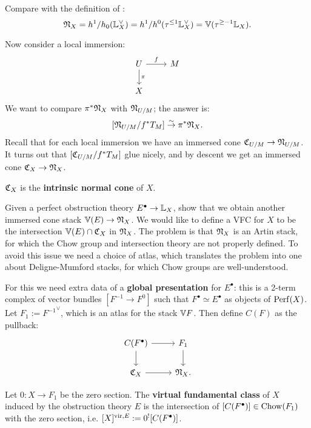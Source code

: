 Compare with the definition of \cite{Behrend_Intrinsic_normal_cone_1997}:
\[	\mathfrak N_X = h^1/h_0(\mathbb L_X^{\vee}) = h^1/h^0(\tau^{\leq 1}\mathbb L_X^{\vee}) = \mathbb V(\tau^{\geq -1} \mathbb L_X) .	\]

Now consider a local immersion:
\[
\begin{tikzcd}
U\arrow{r}{f}\arrow{d}{\pi} & M \\ X & 
\end{tikzcd}
\]
We want to compare $\pi^* \mathfrak N_X$ with $\mathfrak N_{U/M}$; the answer is:
\[	[\mathfrak N_{U/M} / f^* T_M] \overset{\sim}{\to} \pi^*\mathfrak N_X.	\]
Recall that for each local immersion we have an immersed cone $\mathfrak C_{U/M} \to \mathfrak N_{U/M}$.
It turns out that $[\mathfrak C_{U/M}/f^* T_M]$ glue nicely, and by descent we get an immersed cone
$\mathfrak C_X \to \mathfrak N_X$.

\begin{defin}
$\mathfrak C_X$ is the \textbf{intrinsic normal cone} of $X$.
\end{defin}

Given a perfect obstruction theory $E^{\bullet} \to \mathbb L_X$, \cite{Behrend_Intrinsic_normal_cone_1997} show that we
obtain another immersed cone stack $\mathbb V(E) \to \mathfrak N_X$. We would like to define a VFC for $X$ to be
the intersection $\mathbb V(E) \cap \mathfrak C_X$ in $\mathfrak N_X$. The problem is that $\mathfrak N_X$ is an Artin stack, for which
the Chow group and intersection theory are not properly defined. To avoid this issue we need a choice of atlas, which
translates the problem into one
about Deligne-Mumford stacks, for which Chow groups are well-understood. 

For this we need extra data of a \textbf{global presentation} for $E^{\bullet}$: this is a 2-term complex of vector bundles
$[F^{-1} \to F^0]$ such that $F^{\bullet} \simeq E^{\bullet}$ as objects of $\mathrm{Perf}(X)$.
Let $F_1 := {F^{-1}}^{\vee}$, which is an atlas for the stack $\mathbb V{F}$. Then define $C(F)$ as the pullback:
\[
\begin{tikzcd}
C(F^{\bullet})\arrow{r}\arrow{d} & F_1\arrow{d} \\ \fr C_X \arrow{r} & \fr N_X .
\end{tikzcd}
\]

\begin{defin}
Let $0: X \to F_1$ be the zero section.
The \textbf{virtual fundamental class} of $X$ induced by the obstruction theory $E$ is the intersection of
$[C(F^{\bullet})] \in \operatorname{Chow}(F_1)$ with the zero section, i.e. $[X]^{\operatorname{vir}, E} := 0^{!}[C(F^{\bullet})]$.
\end{defin}

